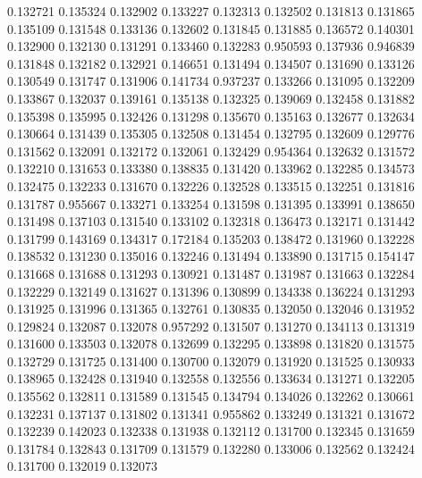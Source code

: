 0.132721
0.135324
0.132902
0.133227
0.132313
0.132502
0.131813
0.131865
0.135109
0.131548
0.133136
0.132602
0.131845
0.131885
0.136572
0.140301
0.132900
0.132130
0.131291
0.133460
0.132283
0.950593
0.137936
0.946839
0.131848
0.132182
0.132921
0.146651
0.131494
0.134507
0.131690
0.133126
0.130549
0.131747
0.131906
0.141734
0.937237
0.133266
0.131095
0.132209
0.133867
0.132037
0.139161
0.135138
0.132325
0.139069
0.132458
0.131882
0.135398
0.135995
0.132426
0.131298
0.135670
0.135163
0.132677
0.132634
0.130664
0.131439
0.135305
0.132508
0.131454
0.132795
0.132609
0.129776
0.131562
0.132091
0.132172
0.132061
0.132429
0.954364
0.132632
0.131572
0.132210
0.131653
0.133380
0.138835
0.131420
0.133962
0.132285
0.134573
0.132475
0.132233
0.131670
0.132226
0.132528
0.133515
0.132251
0.131816
0.131787
0.955667
0.133271
0.133254
0.131598
0.131395
0.133991
0.138650
0.131498
0.137103
0.131540
0.133102
0.132318
0.136473
0.132171
0.131442
0.131799
0.143169
0.134317
0.172184
0.135203
0.138472
0.131960
0.132228
0.138532
0.131230
0.135016
0.132246
0.131494
0.133890
0.131715
0.154147
0.131668
0.131688
0.131293
0.130921
0.131487
0.131987
0.131663
0.132284
0.132229
0.132149
0.131627
0.131396
0.130899
0.134338
0.136224
0.131293
0.131925
0.131996
0.131365
0.132761
0.130835
0.132050
0.132046
0.131952
0.129824
0.132087
0.132078
0.957292
0.131507
0.131270
0.134113
0.131319
0.131600
0.133503
0.132078
0.132699
0.132295
0.133898
0.131820
0.131575
0.132729
0.131725
0.131400
0.130700
0.132079
0.131920
0.131525
0.130933
0.138965
0.132428
0.131940
0.132558
0.132556
0.133634
0.131271
0.132205
0.135562
0.132811
0.131589
0.131545
0.134794
0.134026
0.132262
0.130661
0.132231
0.137137
0.131802
0.131341
0.955862
0.133249
0.131321
0.131672
0.132239
0.142023
0.132338
0.131938
0.132112
0.131700
0.132345
0.131659
0.131784
0.132843
0.131709
0.131579
0.132280
0.133006
0.132562
0.132424
0.131700
0.132019
0.132073

